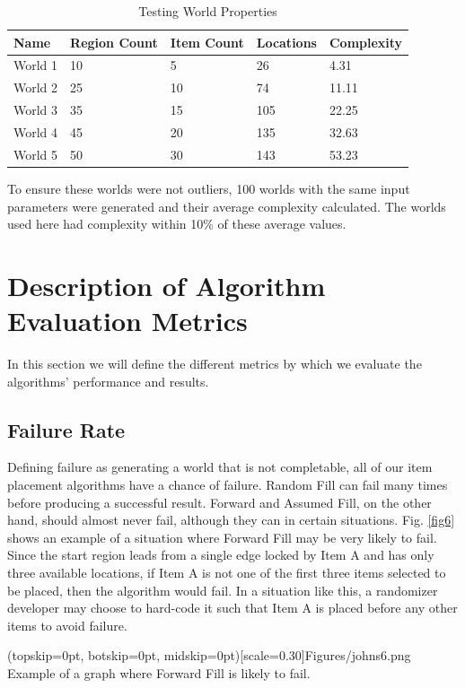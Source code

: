 \documentclass{ieeeaccess}
\begin{document}
\begin{table}
\caption{Testing World Properties}
\label{table2}
\setlength{\tabcolsep}{3pt}
\renewcommand{\arraystretch}{1.2}
\begin{tabular}{ |p{35pt}|p{45pt}|p{45pt}|p{40pt}|p{45pt}|  }
 \hline
 Name & Region Count & Item Count & Locations & Complexity\\
 \hline
 World 1 & 10 & 5 & 26 & 4.31 \\
 \hline
 World 2 & 25 & 10 & 74 & 11.11 \\
 \hline
 World 3 & 35 & 15 & 105 & 22.25 \\
 \hline
 World 4 & 45 & 20 & 135 & 32.63 \\
 \hline
 World 5 & 50 & 30 & 143 & 53.23 \\
 \hline
\end{tabular}
\end{table}

To ensure these worlds were not outliers, 100 worlds with the same input parameters were
generated and their average complexity calculated. The worlds used here had complexity within
10\% of these average values.

\section{Description of Algorithm Evaluation Metrics}
In this section we will define the different metrics by which we evaluate the algorithms'
performance and results.

\subsection{Failure Rate}
Defining failure as generating a world that is not completable,
all of our item placement algorithms have a chance of failure.
Random Fill can fail many times before producing a successful result. Forward and Assumed Fill,
on the other hand, should almost never fail, although they can in certain situations. Fig.
\ref{fig6} shows an example of a situation where Forward Fill may be very likely to fail. Since
the start region leads from a single edge locked by Item A and has only three available
locations, if Item A is not one of the first three items selected to be placed, then the
algorithm would fail. In a situation like this, a randomizer developer may choose to hard-code
it such that Item A is placed before any other items to avoid failure. 

\Figure[t!](topskip=0pt, botskip=0pt, midskip=0pt)[scale=0.30]{Figures/johns6.png}
{Example of a graph where Forward Fill is likely to fail.\label{fig6}}
\end{document}
